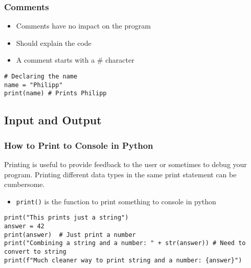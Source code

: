 \documentclass[10pt, a4paper]{beamer} %
\begin{document}
\begin{frame}[c, fragile]\frametitle{Comments}
	\begin{itemize}
		\item Comments have no impact on the program
		\item Should explain the code
		\item A comment starts with a \# character
	\end{itemize}

	\begin{examples}
		\begin{lstlisting}
# Declaring the name
name = "Philipp"
print(name) # Prints Philipp
  \end{lstlisting}
	\end{examples}



\end{frame}

\subsection{Input and Output} %
\label{sub:input_output}

\begin{frame}[c, fragile]\frametitle{How to Print to Console in Python}
	Printing is useful to provide feedback to the user or sometimes to debug your program. Printing different data types
	in the same print statement can be cumbersome.
	\begin{itemize}
		\item \texttt{print()} is the function to print something to console in python
	\end{itemize}

	\begin{lstlisting}
print("This prints just a string")
answer = 42
print(answer)  # Just print a number
print("Combining a string and a number: " + str(answer)) # Need to convert to string
print(f"Much cleaner way to print string and a number: {answer}")
\end{lstlisting}
\end{frame}
\end{document}
